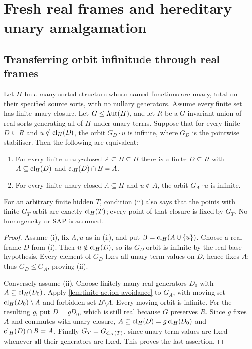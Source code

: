 \section{Fresh real frames and hereditary unary amalgamation}
\label{sec:unary-fresh-frame-sap}

\subsection{Transferring orbit infinitude through real frames}

\begin{lemma}
\label{lem:foundational-real-frame-orbits}
Let $H$ be a many-sorted structure whose named functions are unary,
total on their specified source sorts, with no nullary generators.
Assume every finite set has finite unary closure. Let $G\le\operatorname{Aut}(H)$,
and let $R$ be a $G$-invariant union of real sorts generating all of $H$
under unary terms. Suppose that for every finite $D\subseteq R$ and
$u\notin\operatorname{cl}_H(D)$, the orbit $G_D\cdot u$ is infinite, where $G_D$
is the pointwise stabiliser. Then the following are equivalent:
\begin{enumerate}[label=(\roman*)]
\item For every finite unary-closed $A\subseteq B\subseteq H$ there is
  a finite $D\subseteq R$ with
  $A\subseteq\operatorname{cl}_H(D)$ and $\operatorname{cl}_H(D)\cap B=A$.
\item For every finite unary-closed $A\subseteq H$ and $u\notin A$,
  the orbit $G_A\cdot u$ is infinite.
\end{enumerate}
For an arbitrary finite hidden $T$, condition (ii) also says that the
points with finite $G_T$-orbit are exactly $\operatorname{cl}_H(T)$; every point of
that closure is fixed by $G_T$. No homogeneity or SAP is assumed.
\end{lemma}
\begin{proof}
Assume (i), fix $A,u$ as in (ii), and put
$B=\operatorname{cl}_H(A\cup\{u\})$. Choose a real frame $D$ from (i).
Then $u\notin\operatorname{cl}_H(D)$, so its $G_D$-orbit is infinite by the real-base
hypothesis. Every element of $G_D$ fixes all unary term values on $D$,
hence fixes $A$; thus $G_D\le G_A$, proving (ii).

Conversely assume (ii). Choose finitely many real generators $D_0$
with $A\subseteq\operatorname{cl}_H(D_0)$. Apply \cref{lem:finite-action-avoidance}
to $G_A$, with moving set $\operatorname{cl}_H(D_0)\setminus A$ and forbidden set
$B\setminus A$. Every moving orbit is infinite. For the resulting $g$,
put $D=gD_0$, which is still real because $G$ preserves $R$.
Since $g$ fixes $A$ and commutes with unary closure,
$A\subseteq\operatorname{cl}_H(D)=g\operatorname{cl}_H(D_0)$ and $\operatorname{cl}_H(D)\cap B=A$.
Finally $G_T=G_{\operatorname{cl}_H(T)}$, since unary term values are fixed whenever
all their generators are fixed. This proves the last assertion.
\end{proof}


